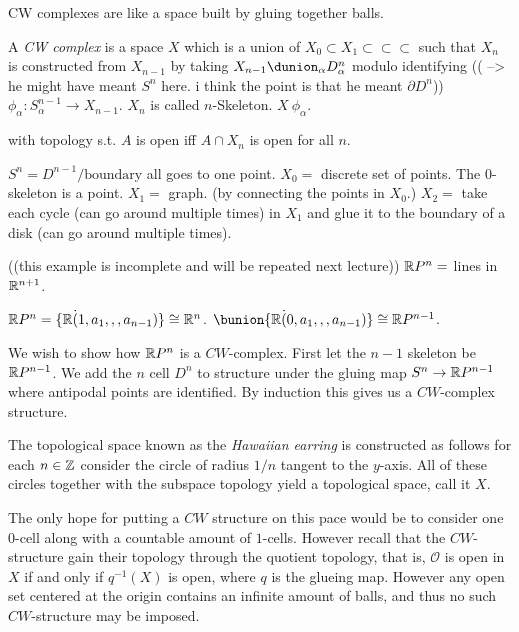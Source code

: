 \documentclass[11pt,leqno,oneside]{amsart}
\newenvironment{dateenv}{
  \vspace{1em}
}{
  \vspace{1em}
}
\newcommand{\mydate}[4]{
  \newdate{#1}{#2}{#3}{#4}
  \begin{dateenv}
    \hfill\displaydate{#1}
  \end{dateenv}
}
\numberwithin{thm}{section}
\renewcommand{\d}{\partial}
\newcommand{\de}{\emph}
\begin{document}
CW complexes are like a space built by gluing together balls.
\begin{defn}
  A \de{CW complex} is a space $X$ which is a union of
  $X_0 \subset X_1 \subset \subset \subset$ such that $X_n$ is
  constructed from $X_{n-1}$ by taking
  $X_{n-1} \dunion_{\alpha} D_{\alpha}^n$ modulo identifying (( --> he
  might have meant $S^n$ here.  i think the point is that he meant
  $\d D^n$)) $\phi_\alpha \colon S_\alpha^{n-1} \to X_{n-1}$.  $X_n$
  is called $n$-Skeleton.  $X ~ \phi_\alpha$.

  with topology s.t. $A$ is open iff $A \cap X_n$ is open for all $n$.
\end{defn}
\begin{example}
  $S^n = D^{n-1}/\text{boundary}$ all goes to one point.  $X_0 =$
  discrete set of points.  The $0$-skeleton is a point.  $X_1 =$
  graph. (by connecting the points in $X_0$.)  $X_2 =$ take each cycle
  (can go around multiple times) in $X_1$ and glue it to the boundary
  of a disk (can go around multiple times).
\end{example}
\begin{example}
  ((this example is incomplete and will be repeated next lecture))
  ${\mathbb R} P^n =$ lines in ${\mathbb R}^{n+1}$.

  ${\mathbb R} P^n = \{ {\mathbb R} \dot (1, a_1,,, a_{n-1})\} \mathrel{\cong} {\mathbb R}^{n}$.
  $\bunion \{ \R \dot (0, a_1,,, a_{n-1})\} \isom \R P^{n-1}$.
\end{example}

\mydate{d7}{6}{2}{2017}

We wish to show how \({\mathbb R} P^n\) is a \(CW\)-complex. First let the
\(n-1\) skeleton be \({\mathbb R} P^{n-1}\). We add the \(n\) cell \(D^n\) to
structure under the gluing map \(S^{n} \to {\mathbb R} P^{n-1}\) where
antipodal points are identified. By induction this gives us a
\(CW\)-complex structure.

\begin{example}
  The topological space known as the \emph{Hawaiian earring} is
  constructed as follows for each \(n \in {\mathbb Z}\) consider the circle of
  radius \(1/n\) tangent to the \(y\)-axis. All of these circles
  together with the subspace topology yield a topological space, call
  it \(X\).

  The only hope for putting a \(CW\) structure on this pace would be
  to consider one \(0\)-cell along with a countable amount of
  \(1\)-cells. However recall that the \(CW\)-structure gain their
  topology through the quotient topology, that is, \(\mathcal{O}\) is
  open in \(X\) if and only if \(q^{-1}(X)\) is open, where \(q\) is
  the glueing map. However any open set centered at the origin
  contains an infinite amount of balls, and thus no such
  \(CW\)-structure may be imposed.
\end{example}
\end{document}
